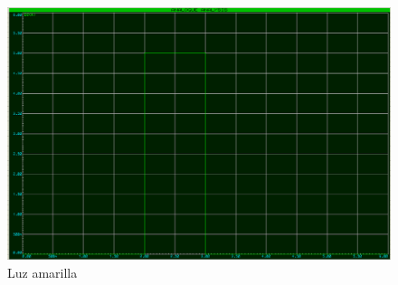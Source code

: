 \documentclass{article}
\begin{document}
\begin{enumerate}[label=\alph*.]
\begin{figure}[h!]
    \centering
    \includegraphics[width=0.6\linewidth]{img/Señal amarillo.png}
    \caption{Luz amarilla}
    \label{fig:esquematico}
\end{figure}

\end{enumerate}
\end{document}
